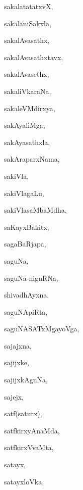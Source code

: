 \begin{multicols}{3}
{\noindent
{sakalatatatxvX}, \pageref{sakalatatatxvX}

\noindent
{sakalaniSakxla}, \pageref{sakalaniSakxla}

\noindent
{sakalAvasathx}, \pageref{sakalAvasathx}

\noindent
{sakalAvasathxtavx}, \pageref{sakalAvasathxtavx}

\noindent
{sakalAvasethx}, \pageref{sakalAvasethx}

\noindent
{sakaliVkaraNa}, \pageref{sakaliVkaraNa}

\noindent
{sakaleVMdirxya}, \pageref{sakaleVMdirxya}

\noindent
{sakAyaliMga}, \pageref{sakAyaliMga}

\noindent
{sakAyasathxla}, \pageref{sakAyasathxla}

\noindent
{sakAraparxNama}, \pageref{sakAraparxNama}

\noindent
{sakiVla}, \pageref{sakiVla}

\noindent
{sakiVlagaLu}, \pageref{sakiVlagaLu}

\noindent
{sakiVlasaMbaMdha}, \pageref{sakiVlasaMbaMdha}

\noindent
{saKayxBakitx}, \pageref{saKayxBakitx}

\noindent
{sagaBaRjapa}, \pageref{sagaBaRjapa}

\noindent
{saguNa}, \pageref{saguNa}

\noindent
{saguNa-niguRNa}, \pageref{saguNa-niguRNa}

\noindent
{shivadhAyxna}, \pageref{shivadhAyxna}

\noindent
{saguNApiRta}, \pageref{saguNApiRta}

\noindent
{saguNASATxMgayoVga}, \pageref{saguNASATxMgayoVga}

\noindent
{sajajxna}, \pageref{sajajxna}

\noindent
{sajijxke}, \pageref{sajijxke}

\noindent
{sajijxkAguNa}, \pageref{sajijxkAguNa}

\noindent
{sajejx}, \pageref{sajejx}

\noindent
{satf(satutx)}, \pageref{satfsatutx}

\noindent
{satfkirxyAnaMda}, \pageref{satfkirxyAnaMda}

\noindent
{satfkirxVvaMta}, \pageref{satfkirxVvaMta}

\noindent
{satayx}, \pageref{satayx}

\noindent
{satayxloVka}, \pageref{satayxloVka}

}
\end{multicols}
